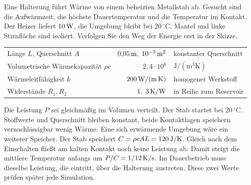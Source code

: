 Eine Halterung führt Wärme von einem beheizten Metallstab ab. Gesucht sind die Aufwärmzeit, die höchste Dauertemperatur und die Temperatur im Kontakt. Der Heizer liefert \(10\,\mathrm{W}\), die Umgebung bleibt bei \(20\,^\circ\mathrm C\), Mantel und linke Stirnfläche sind isoliert. Verfolgen Sie den Weg der Energie erst in der Skizze.
{\tblstart\begin{tabularx}{\linewidth}{@{}P{47mm}rY@{}}\toprule
{} &  & \\\midrule
Länge \(L\), Querschnitt \(A\)& \(0{,}05\,\mathrm{m},\;10^{-3}\,\mathrm{m^2}\)& konstanter Querschnitt\\
Volumetrische Wärmekapazität \(\rho c\)& \(2{,}4\cdot10^6\)& \(\mathrm{J/(m^3 K)}\)\\
Wärmeleitfähigkeit \(k\)& \(200\,\mathrm{W/(m\,K)}\)& homogener Werkstoff\\
Widerstände \(R_1,R_2\)& \(1,\;3\,\mathrm{K/W}\)& in Reihe zum Reservoir\\\bottomrule
\end{tabularx}\par}
Die Leistung \(P\) sei gleichmäßig im Volumen verteilt. Der Stab startet bei \(20\,^\circ\mathrm C\). Stoffwerte und Querschnitt bleiben konstant, beide Kontaktlagen speichern vernachlässigbar wenig Wärme. Eine sich erwärmende Umgebung wäre ein weiterer Speicher.
Der Stab speichert \(C=\rho cAL=120\,\mathrm{J/K}\). Gleich nach dem Einschalten fließt am kalten Kontakt noch keine Leistung ab. Damit steigt die mittlere Temperatur anfangs um \(P/C=1/12\,\mathrm{K/s}\). Im Dauerbetrieb muss dieselbe Leistung, die eintritt, über die Halterung austreten. Diese zwei Werte prüfen später jede Simulation.


